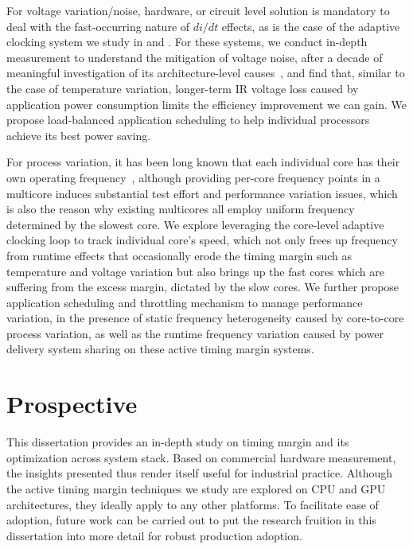 For voltage variation/noise, hardware, or circuit level solution is mandatory to deal with the fast-occurring nature of $di/dt$ effects, as is the case of the adaptive clocking system we study in  and . For these systems, we conduct in-depth measurement to understand the mitigation of voltage noise, after a decade of meaningful investigation of its architecture-level causes~\cite{grochowski2002microarchitectural,powell2003pipeline,gupta2007understanding,gupta2008decor,gupta2009event,reddi2009voltage,reddi2010voltage,miller2012vrsync,zhang2014architecture}, and find that, similar to the case of temperature variation, longer-term IR voltage loss caused by application power consumption limits the efficiency improvement we can gain. We propose load-balanced application scheduling to help individual processors achieve its best power saving.

For process variation, it has been long known that each individual core has their own operating frequency~\cite{liang2007process,sarangi2008varius,teodorescu2008variation,rangan2009thread,dighe2010within,rangan2011achieving}, although providing per-core frequency points in a multicore induces substantial test effort and performance variation issues, which is also the reason why existing multicores all employ uniform frequency determined by the slowest core. We explore leveraging the core-level adaptive clocking loop to track individual core's speed, which not only frees up frequency from runtime effects that occasionally erode the timing margin such as temperature and voltage variation but also brings up the fast cores which are suffering from the excess margin, dictated by the slow cores. We further propose application scheduling and throttling mechanism to manage performance variation, in the presence of static frequency heterogeneity caused by core-to-core process variation, as well as the runtime frequency variation caused by power delivery system sharing on these active timing margin systems.

\section{Prospective}
\label{sec:conc:pros}

This dissertation provides an in-depth study on timing margin and its optimization across system stack. Based on commercial hardware measurement, the insights presented thus render itself useful for industrial practice. Although the active timing margin techniques we study are explored on CPU and GPU architectures, they ideally apply to any other platforms. To facilitate ease of adoption, future work can be carried out to put the research fruition in this dissertation into more detail for robust production adoption.

